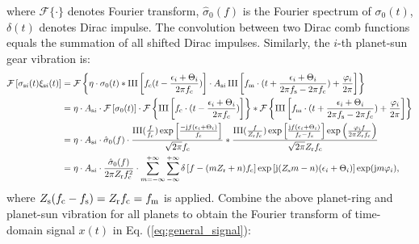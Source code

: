 \documentclass[a4paper,fleqn]{cas-sc}%
\begin{document}
where $\mathcal{F}\{\cdot\}$ denotes Fourier transform, $\hat{\sigma}_0(f)$ is the Fourier spectrum of $\sigma_0(t)$, $\delta(t)$ denotes Dirac impulse. The convolution between two Dirac comb functions equals the summation of all shifted Dirac impulses. Similarly,  the $i$-th planet-sun gear vibration is:
\begin{equation}
    \begin{split}
        \mathcal{F}\left[\sigma_{{\rm s}i}(t) \xi_{{\rm s}i}(t)\right]&=\mathcal{F}\left\{ \eta \cdot \sigma_0(t) \ast \operatorname{III}\left[f_{\rm c}(t-\frac{\epsilon_i+\Theta_i}{2 \pi f_{\rm c}})\right] \cdot A_{{\rm s}i} \operatorname{III} \left[ f_{\rm m} \cdot (t+ \frac{\epsilon_i+\Theta_i}{2\pi f_{\rm s} -2\pi f_{\rm c}} ) +\frac{\varphi_i}{2\pi} \right] \right\}\\
        &=\eta \cdot A_{{\rm s}i} \cdot \mathcal{F}\left[\sigma_0(t)\right] \cdot \mathcal{F}\left\{ \operatorname{III}\left[f_{\rm c} \cdot (t-\frac{\epsilon_i+\Theta_i}{2\pi f_{\rm c}}) \right] \right\} \ast \mathcal{F}\left\{\operatorname{III} \left[ f_{\rm m} \cdot (t+ \frac{\epsilon_i+\Theta_i}{2\pi f_{\rm s} -2\pi f_{\rm c}} ) +\frac{\varphi_i}{2\pi} \right]\right\}\\
        &=\eta \cdot A_{{\rm s}i} \cdot \hat{\sigma}_0(f) \cdot \frac{\operatorname{III}(\frac{f}{f_{\rm c}}) \exp\left[\frac{-{\rm j}f(\epsilon_i+\Theta_i)}{f_{\rm c}}\right]}{\sqrt{2 \pi} f_{\rm c}} \ast \frac{\operatorname{III}(\frac{f}{Z_{\rm r}f_{\rm c}})\exp\left[\frac{{\rm j}f(\epsilon_i+\Theta_i)}{f_{\rm c}-f_{\rm s}}\right] \exp\left(\frac{\varphi_i f}{2\pi Z_{\rm r} f_{\rm c} } \right)}{\sqrt{2 \pi }Z_{\rm r} f_{\rm c}}\\
        &=\eta \cdot A_{{\rm s}i} \cdot \frac{\hat{\sigma}_0(f)}{2 \pi  Z_{\rm r} f_{\rm c}^2} \cdot \sum_{m=-\infty}^{+\infty} \sum_{-\infty}^{+\infty} \delta\left[f-(m Z_{\rm r}+ n)f_{\rm c} \right] \exp\left[ {\rm j} (Z_{\rm s} m - n)(\epsilon_i+\Theta_i) \right] \exp({\rm j}m \varphi_i),
    \end{split}
\end{equation}
where $Z_{\rm s}  (f_{\rm c} -f_{\rm s})= Z_{\rm r} f_{\rm c} =f_{\rm m}$ is applied. Combine the above planet-ring and planet-sun vibration for all planets to obtain the Fourier transform of time-domain signal $x(t)$ in Eq. (\ref{eq:general_signal}):
\end{document}
